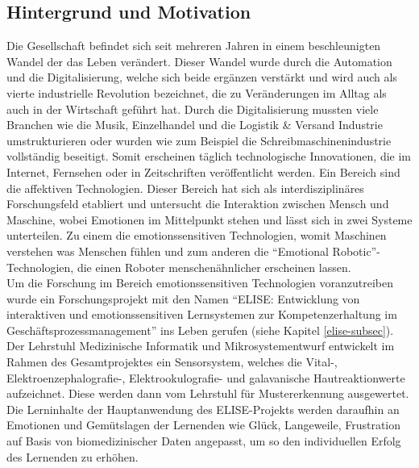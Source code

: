 \subsection{Hintergrund und Motivation} \label{hintergrund-subsec}


Die Gesellschaft befindet sich seit mehreren Jahren in einem beschleunigten Wandel der das Leben ver{\"a}ndert. 
Dieser Wandel wurde durch die Automation und die Digitalisierung, welche sich beide erg{\"a}nzen verst{\"a}rkt und wird auch als vierte industrielle Revolution bezeichnet, die zu Ver{\"a}nderungen im Alltag als auch in der Wirtschaft gef{\"u}hrt hat. 
Durch die Digitalisierung mussten viele Branchen wie die Musik, Einzelhandel und die Logistik \& Versand Industrie umstrukturieren oder wurden wie zum Beispiel die Schreibmaschinenindustrie vollst{\"a}ndig beseitigt. 
Somit erscheinen t{\"a}glich technologische Innovationen, die im Internet, Fernsehen oder in Zeitschriften ver{\"o}ffentlicht werden. 
Ein Bereich sind die affektiven Technologien. 
Dieser Bereich hat sich als interdisziplin{\"a}res Forschungsfeld etabliert und untersucht die Interaktion zwischen Mensch und Maschine, wobei Emotionen im Mittelpunkt stehen und l{\"a}sst sich in zwei Systeme unterteilen. 
Zu einem die emotionssensitiven Technologien, womit Maschinen verstehen was Menschen f{\"u}hlen und zum anderen die ``Emotional Robotic''- Technologien, die einen Roboter menschen{\"a}hnlicher erscheinen lassen. \\

Um die Forschung im Bereich emotionssensitiven Technologien voranzutreiben wurde ein Forschungsprojekt mit den Namen ``ELISE: Entwicklung von interaktiven und emotionssensitiven Lernsystemen zur Kompetenzerhaltung im Gesch{\"a}ftsprozessmanagement'' ins Leben gerufen (siehe Kapitel \ref{elise-subsec}). \\

Der Lehrstuhl Medizinische Informatik und Mikrosystementwurf entwickelt im Rahmen des Gesamtprojektes ein Sensorsystem, welches die Vital-, Elektroenzephalografie-, Elektrookulografie- und galavanische Hautreaktionwerte aufzeichnet. 
Diese werden dann vom Lehrstuhl f{\"u}r Mustererkennung ausgewertet. 
Die Lerninhalte der Hauptanwendung des ELISE-Projekts werden daraufhin an Emotionen und Gem{\"u}tslagen der Lernenden wie Gl{\"u}ck, Langeweile, Frustration auf Basis von biomedizinischer Daten angepasst, um so den individuellen Erfolg des Lernenden zu erh{\"o}hen. \\

